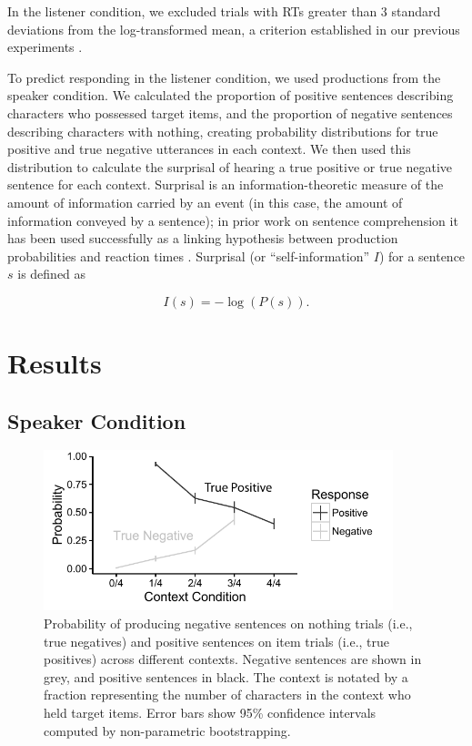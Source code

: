\documentclass[man, noapacite]{apa2}
\begin{document}
In the listener condition, we excluded trials with RTs greater than 3 standard deviations from the log-transformed mean, a criterion established in our previous experiments \cite{nordmeyer2014}.

To predict responding in the listener condition, we used productions from the speaker condition. We calculated the proportion of positive sentences describing characters who possessed target items, and the proportion of negative sentences describing characters with nothing, creating probability distributions for true positive and true negative utterances in each context.  We then used this distribution to calculate the surprisal of hearing a true positive or true negative sentence for each context. Surprisal is an information-theoretic measure of the amount of information carried by an event (in this case, the amount of information conveyed by a sentence); in prior work on sentence comprehension it has been used successfully as a linking hypothesis between production probabilities and reaction times \cite{levy2008}. Surprisal (or ``self-information'' $I$) for a sentence $s$ is defined as

\begin{equation}
\label{eq:surprise}
I(s) = -\log(P(s)).
\end{equation}

\section{Results}

\subsection{Speaker Condition}

\begin{figure}[t]
\begin{center}
\includegraphics[width=4in]{figures/probs.pdf}
\caption{\label{fig:speakerprobs} Probability of producing negative sentences on nothing trials (i.e., true negatives) and positive sentences on item trials (i.e., true positives) across different contexts. Negative sentences are shown in grey, and positive sentences in black.  The context is notated by a fraction representing the number of characters in the context who held target items. Error bars show 95\% confidence intervals computed by non-parametric bootstrapping.  }
\end{center}
\end{figure}
\end{document}
